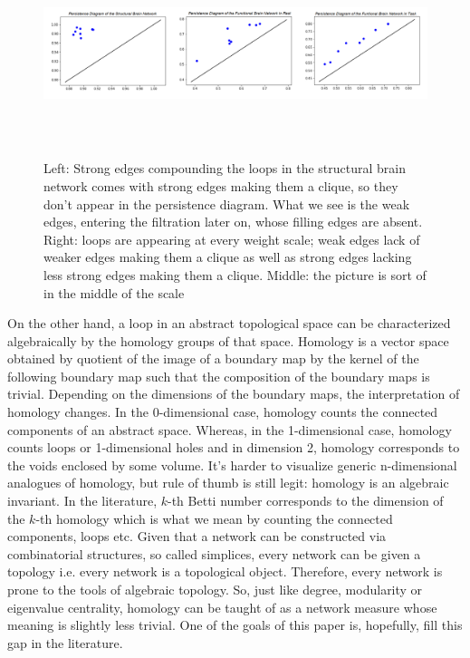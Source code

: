 \documentclass[9pt,twocolumn,twoside,lineno]{pnas-new}
\begin{document}
\begin{figure}%
\centering
\includegraphics[width=16cm,height=6cm]{peristencediagrams.png}
\caption{Left: Strong edges compounding the loops in the structural brain network comes with strong edges making them a clique, so they don't appear in the persistence diagram. What we see is the weak edges, entering the filtration later on, whose filling edges are absent. Right: loops are appearing at every weight scale; weak edges lack of weaker edges making them a clique as well as strong edges lacking less strong edges making them a clique. Middle: the picture is sort of in the middle of the scale}
\end{figure}

On the other hand, a loop in an abstract topological space can be characterized algebraically by the homology groups of that space. Homology is a vector space obtained by quotient of the image of a boundary map by the kernel of the following boundary map such that the composition of the boundary maps is trivial\cite{topologyanddata}. Depending on the dimensions of the boundary maps, the interpretation of homology changes. In the 0-dimensional case, homology counts the connected components of an abstract space. Whereas, in the 1-dimensional case, homology counts loops or 1-dimensional holes and in dimension 2, homology corresponds to the voids enclosed by some volume. It's harder to visualize generic n-dimensional analogues of homology, but rule of thumb is still legit: homology is an algebraic invariant. In the literature, $k$-th Betti number corresponds to the dimension of the $k$-th homology which is what we mean by counting the connected components, loops etc. Given that a network can be constructed via combinatorial structures, so called simplices, every network can be given a topology i.e. every network is a topological object. Therefore, every network is prone to the tools of algebraic topology. So, just like degree, modularity or eigenvalue centrality, homology can be taught of as a network measure whose meaning is slightly less trivial. One of the goals of this paper is, hopefully, fill this gap in the literature.
\end{document}
